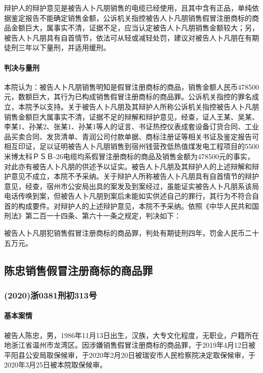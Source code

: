 \documentclass[
    a4paper
    ]{ctexart}
\begin{document}
{\begin{sloppy}
辩护人的辩护意见是被告人卜凡朋销售的电缆已经使用，且其中含有正品，单纯依据鉴定报告不能确定销售金额，公诉机关指控被告人卜凡朋销售假冒注册商标的商品金额巨大，属事实不清，证据不足，应当认定被告人卜凡朋销售金额较大；另，被告人卜凡朋具有自首情节，依法可从轻或减轻处罚，建议对被告人卜凡朋在有期徒刑三年以下量刑，并适用缓刑。


\paragraph{判决与量刑}
本院认为：被告人卜凡朋销售明知是假冒注册商标的商品，销售金额人民币478500元，数额巨大，其行为已构成销售假冒注册商标的商品罪。公诉机关指控的罪名成立，本院予以支持。关于被告人卜凡朋及其辩护人所称公诉机关指控被告人卜凡朋销售金额巨大属事实不清，证据不足的辩解和辩护意见，经查，证人王某、吴某、李某1、孙某2、张某1、孙某1等人的证言、书证热控仪表成套设备订货合同、工业品买卖合同、发货清单、青润公司付款单据、商标注册证等相关书证及鉴定报告可相互印证，足以证明被告人卜凡朋销售到宿州钱营孜低热值煤发电工程项目的5500米博太科ＰＳＢ-26电缆均系假冒注册商标的商品及销售金额为478500元的事实，对此亦有被告人卜凡朋的供述予以证实。被告人卜凡朋及其辩护人的上述辩解和辩护意见不成立，本院不予采纳。关于辩护人所称被告人卜凡朋具有自首情节的辩护意见，经查，宿州市公安局出具的案发及到案经过，虽能证实被告人卜凡朋系该局电话传唤到案，但被告人卜凡朋到案后未能如实供述自己的罪行，其行为不符合自首的构成要件。对辩护人的上述辩护意见，本院不予采纳。依照《中华人民共和国刑法》第二百一十四条、第六十一条之规定，判决如下：

被告人卜凡朋犯销售假冒注册商标的商品罪，判处有期徒刑四年，罚金人民币二十五万元。



\subsection{陈忠销售假冒注册商标的商品罪}
\subsubsection*{(2020)浙0381刑初313号}
\paragraph{基本案情}
被告人陈忠，男，1986年11月13日出生，汉族，大专文化程度，无职业，户籍所在地浙江省温州市龙湾区。因涉嫌销售假冒注册商标的商品罪，于2019年4月12日被平阳县公安局取保候审，于2020年2月20日被瑞安市人民检察院决定取保候审，于2020年3月25日被本院取保候审。


\end{sloppy}}
\end{document}
